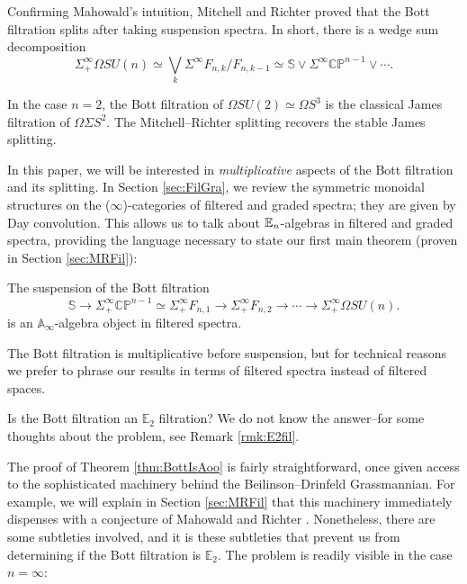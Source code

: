 Confirming Mahowald's intuition, Mitchell and Richter \cite[Theorem 2.1]{CrabbMitchell} proved that the Bott filtration splits after taking suspension spectra.  In short, there is a wedge sum decomposition
$$\Sigma^{\infty}_+ \Omega SU(n) \simeq \bigvee_k \Sigma^{\infty} F_{n,k}/F_{n,k-1} \simeq \mathbb{S} \vee \Sigma^{\infty} \mathbb{CP}^{n-1} \vee \cdots.$$

\begin{exm}
In the case $n=2$, the Bott filtration of $\Omega SU(2) \simeq \Omega S^3$ is the classical James filtration of $\Omega \Sigma S^2$.  The Mitchell--Richter splitting recovers the stable James splitting.
\end{exm}

In this paper, we will be interested in \emph{multiplicative} aspects of the Bott filtration and its splitting.  In Section \ref{sec:FilGra}, we review the symmetric monoidal structures on the ($\infty$)-categories of filtered and graded spectra; they are given by Day convolution.  This allows us to talk about $\operatorname{\mathbb{E}}_n$-algebras in filtered and graded spectra, providing the language necessary to state our first main theorem (proven in Section \ref{sec:MRFil}):

\begin{thm} \label{thm:BottIsAoo}
The suspension of the Bott filtration 
$$\mathbb{S} \longrightarrow \Sigma_+^{\infty} \mathbb{CP}^{n-1} \simeq \Sigma_+^{\infty} F_{n,1} \longrightarrow \Sigma_+^{\infty} F_{n,2} \longrightarrow \cdots \longrightarrow \Sigma^{\infty}_+ \Omega SU(n).$$
is an $\mathbb{A}_\infty$-algebra object in filtered spectra.
\end{thm}

\begin{rmk}
The Bott filtration is multiplicative before suspension, but for technical reasons we prefer to phrase our results in terms of filtered spectra instead of filtered spaces.
\end{rmk}

\begin{qst} \label{qst:BottE2}
Is the Bott filtration an $\mathbb{E}_2$ filtration?  We do not know the answer--for some thoughts about the problem, see Remark \ref{rmk:E2fil}.
\end{qst}

The proof of Theorem \ref{thm:BottIsAoo} is fairly straightforward, once given access to the sophisticated machinery behind the Beilinson--Drinfeld Grassmannian.  For example, we will explain in Section \ref{sec:MRFil} that this machinery immediately dispenses with a conjecture of Mahowald and Richter \cite{MahowaldRichter}.  Nonetheless, there are some subtleties involved, and it is these subtleties that prevent us from determining if the Bott filtration is $\mathbb{E}_2$.  The problem is readily visible in the case $n=\infty$:

